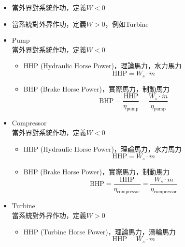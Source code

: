 \documentclass[../main.tex]{subfiles}
\begin{document}
\begin{itemize}
\begin{itemize}
    由於機械裝置的能量以功率表示(J/s)，故需要作單位轉換
    \begin{equation}
      P\left(\frac{J}{s}\right) = W_s\left(
        \frac{J}{kg}
      \right)\cdot \dot m \left(
        \frac{kg}{s}
      \right)
    \end{equation}
    \item 當外界對系統作功，定義$W<0$
    \item 當系統對外界作功，定義$W>0$，例如Turbine
    \item Pump\\
    當外界對系統作功，定義$W<0$
    \begin{itemize}
      \item HHP (Hydraulic Horse Power)，理論馬力，水力馬力
      \begin{equation}
        \text{HHP} = W_s \cdot \dot m
      \end{equation}
      \item BHP (Brake Horse Power)，實際馬力，制動馬力
      \begin{equation}
        \text{BHP} = \boxed{\frac{\text{HHP}}{\eta_{\text{pump}}}} = \frac{W_s \cdot \dot m}{\eta_{\text{pump}}}
      \end{equation}
      \end{itemize}
    \item Compressor\\
    當外界對系統作功，定義$W<0$
    \begin{itemize}
      \item HHP (Hydraulic Horse Power)，理論馬力，水力馬力
      \begin{equation}
        \text{HHP} = W_s \cdot \dot m
      \end{equation}
      \item BHP (Brake Horse Power)，實際馬力，制動馬力
      \begin{equation}
        \text{BHP} = \boxed{\frac{\text{HHP}}{\eta_{\text{compressor}}}} = \frac{W_s \cdot \dot m}{\eta_{\text{compressor}}}
      \end{equation}
    \end{itemize}
    \item Turbine\\
    當系統對外界作功，定義$W>0$
    \begin{itemize}
      \item HHP (Turbine Horse Power)，理論馬力，渦輪馬力
      \begin{equation}
        \text{HHP} = W_s \cdot \dot m
      \end{equation}

\end{itemize}
\end{itemize}
\end{itemize}
\end{document}
